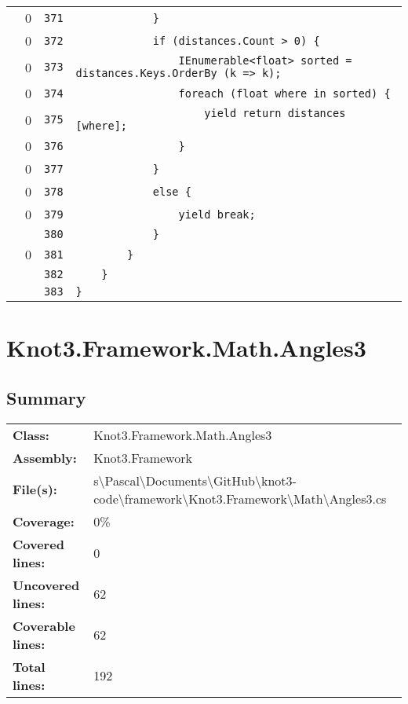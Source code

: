 \documentclass[a4paper,10pt]{article}
\begin{document}
\begin{longtable}[l]{lrrl}
\cellcolor{red} & 0 & \verb~371~ & \verb~            }~\\
\cellcolor{red} & 0 & \verb~372~ & \verb~            if (distances.Count > 0) {~\\
\cellcolor{red} & 0 & \verb~373~ & \verb~                IEnumerable<float> sorted = distances.Keys.OrderBy (k => k);~\\
\cellcolor{red} & 0 & \verb~374~ & \verb~                foreach (float where in sorted) {~\\
\cellcolor{red} & 0 & \verb~375~ & \verb~                    yield return distances [where];~\\
\cellcolor{red} & 0 & \verb~376~ & \verb~                }~\\
\cellcolor{red} & 0 & \verb~377~ & \verb~            }~\\
\cellcolor{red} & 0 & \verb~378~ & \verb~            else {~\\
\cellcolor{red} & 0 & \verb~379~ & \verb~                yield break;~\\
\cellcolor{gray} &  & \verb~380~ & \verb~            }~\\
\cellcolor{red} & 0 & \verb~381~ & \verb~        }~\\
\cellcolor{gray} &  & \verb~382~ & \verb~    }~\\
\cellcolor{gray} &  & \verb~383~ & \verb~}~\\
\end{longtable}
\newpage
\section{Knot3.Framework.Math.Angles3}
\subsection{Summary}
\begin{longtable}[l]{ll}
\textbf{Class:} & Knot3.Framework.Math.Angles3\\
\textbf{Assembly:} & Knot3.Framework\\
\textbf{File(s):} & \begin{minipage}[t]{12cm}{s\textbackslash Pascal\textbackslash Documents\textbackslash GitHub\textbackslash knot3-code\textbackslash framework\textbackslash Knot3.Framework\textbackslash Math\textbackslash Angles3.cs}\end{minipage} \\
\textbf{Coverage:} & 0\%\\
\textbf{Covered lines:} & 0\\
\textbf{Uncovered lines:} & 62\\
\textbf{Coverable lines:} & 62\\
\textbf{Total lines:} & 192\\
\end{longtable}
\end{document}

